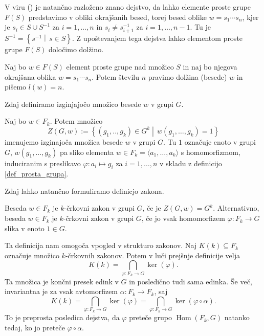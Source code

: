 \documentclass[mat1, tisk]{fmfdelo}
\numberwithin{equation}{section}  %
\begin{document}
\noindent
V viru (\cite[str.~4, tridtev 1.9]{Lyndon_Schupp_2015}) je natančno razloženo znano dejstvo, da lahko elemente proste grupe $F(S)$ predstavimo v obliki okrajšanih besed,
torej besed oblike $w = s_1 \cdots s_n$, kjer je $s_i \in S \cup S^{-1}$ za $i = 1, \ldots, n$ in $s_i \neq s_{i+1}^{-1}$ za $i = 1, \ldots, n-1$. Tu je $S^{-1} = \left\{ s^{-1}  \middle|\, s \in  S \right\}$.
Z upoštevanjem tega dejstva lahko elementom proste grupe $F(S)$ določimo dolžino.

\begin{definicija}
\label{def_dolzina_besede}
Naj bo $w \in  F(S)$ element proste grupe nad množico $S$ in naj bo njegova okrajšana oblika $w = s_1 \cdots s_n$. Potem številu $n$ pravimo dolžina (besede) $w$ in pišemo $l(w) = n$.
\end{definicija}

\noindent
Zdaj definiramo izginjajočo množico besede $w$ v grupi $G$.

\begin{definicija}
\label{def_izginjajoca_mnozica}
Naj bo $w \in  F_k$. Potem množico \begin{equation*}
Z(G, w) := \left\{ (g_1, .., g_{k}) \in  G^{k}  \middle|\, w(g_1, \ldots, g_{k}) = 1 \right\} 
\end{equation*}  
imenujemo izginajoča množica besede $w$ v grupi $G$. Tu $1$ označuje enoto v grupi $G$, $w(g_1, \ldots, g_{k})$ pa sliko elementa $w \in F_k = \langle a_{1}, \ldots , a_k \rangle$ s homomorfizmom,
induciranim s preslikavo $\varphi: a_{i} \mapsto g_{i}$ za $i = 1,\ldots, n$ v skladu z definicijo \ref{def_prosta_grupa}.  
\end{definicija}

\indent
Zdaj lahko natančno formuliramo definicjo zakona.

\begin{definicija}\label{def_zakon_formalna}
Beseda $w \in F_k$ je $k$-črkovni zakon v grupi $G$, če je $Z(G, w) = G^{k}$. Alternativno, beseda $w \in F_k$ je $k$-črkovni zakon v grupi $G$, če jo vsak homomorfizem $\varphi: F_k \to G$ slika v enoto $1 \in G$.   
\end{definicija}

Ta definicija nam omogoča vpogled v strukturo zakonov. Naj $K(k) \subseteq F_k$ označuje množico $k$-črkovnih zakonov. Potem v luči prejšnje definicije velja
\begin{equation*}
K(k)  = \bigcap_{\varphi: F_k \to G} \ker(\varphi).   
\end{equation*}  
Ta množica je končni presek edink v $G$ in posledično tudi sama edinka. Še več, invariantna je za vsak avtomorfizem $\alpha: F_k \to  F_k$, saj
\begin{equation*}
    K(k)  = \bigcap_{\varphi: F_k \to G} \ker(\varphi) = \bigcap_{\varphi: F_k \to G} \ker(\varphi \circ \alpha). 
\end{equation*}  
To je preprosta posledica dejstva, da $\varphi$ preteče grupo $\operatorname{Hom}(F_k, G)$ natanko tedaj, ko jo preteče $\varphi \circ \alpha$.     
\end{document}
